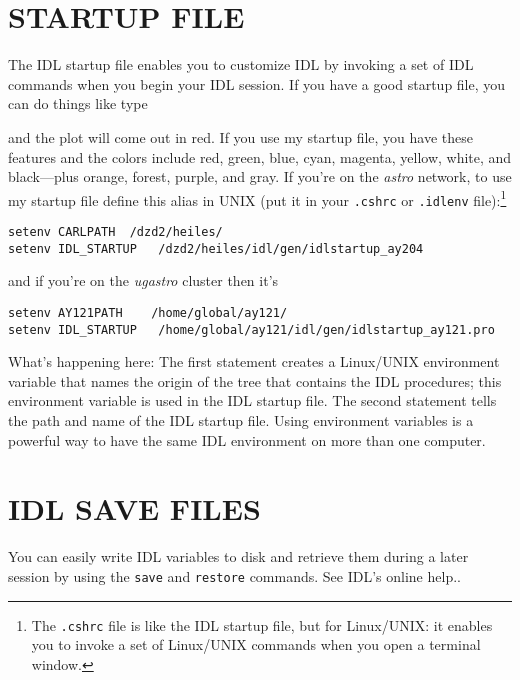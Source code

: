 \documentclass[psfig,preprint]{aastex}
\begin{document}
\section {STARTUP FILE} \label{startup}

The IDL startup file enables you to customize IDL by invoking a set of
IDL commands when you begin your IDL session. If you have a good startup
file, you can do things like type


\noindent and the plot will come out in red.  If you use my startup
file, you have these features and the colors include red, green, blue,
cyan, magenta, yellow, white, and black---plus orange, forest, purple,
and gray.  If you're on the {\it astro}
network, to use my startup file define this alias in UNIX (put it in
your \verb$.cshrc$ or \verb$.idlenv$ file):\footnote{The {\tt .cshrc}
  file is like the IDL startup file, but for Linux/UNIX: it enables you to invoke a set of
  Linux/UNIX commands when you open a terminal window.}

\begin{verbatim}
setenv CARLPATH  /dzd2/heiles/
setenv IDL_STARTUP   /dzd2/heiles/idl/gen/idlstartup_ay204
\end{verbatim}

\noindent and if you're on the {\it ugastro} cluster then it's

\begin{verbatim}
setenv AY121PATH    /home/global/ay121/
setenv IDL_STARTUP   /home/global/ay121/idl/gen/idlstartup_ay121.pro

\end{verbatim}

\noindent What's happening here: The first statement creates a
Linux/UNIX environment variable that names the origin of
the tree that contains the IDL procedures; this environment variable is
used in the IDL startup file. The second statement tells the path and
name of the IDL startup file. Using environment variables is a powerful
way to have the same IDL environment on more than one computer.

\section{IDL SAVE FILES}

You can easily write IDL variables to disk and retrieve them during a later
session by using the \verb$save$ and \verb$restore$ commands. See IDL's
online help.. 
\end{document}
